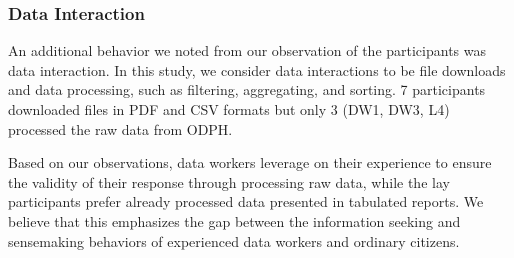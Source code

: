 \documentclass{sigchi}
\begin{document}
\subsubsection{Data Interaction}
An additional behavior we noted from our observation of the participants was data interaction. In this study, we consider data interactions to be file downloads and data processing, such as filtering, aggregating, and sorting. 7 participants downloaded files in PDF and CSV formats but only 3 (DW1, DW3, L4) processed the raw data from ODPH.

Based on our observations, data workers leverage on their experience to ensure the validity of their response through processing raw data, while the lay participants prefer already processed data presented in tabulated reports. We believe that this emphasizes the gap between the information seeking and sensemaking behaviors of experienced data workers and ordinary citizens.


\end{document}

